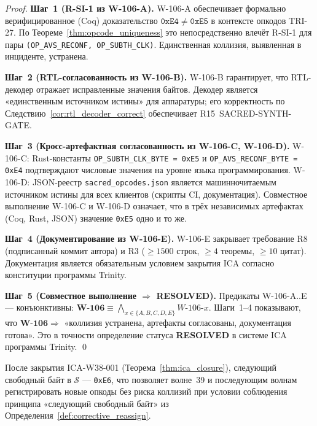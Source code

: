 \begin{proof}

\medskip
\noindent\textbf{Шаг~1 (R-SI-1 из W-106-A).}
W-106-A обеспечивает формально верифицированное (Coq) доказательство
$\mathtt{0xE4} \neq \mathtt{0xE5}$ в контексте опкодов TRI-27.
По Теореме~\ref{thm:opcode_uniqueness} это непосредственно влечёт
R-SI-1 для пары \texttt{(OP\_AVS\_RECONF, OP\_SUBTH\_CLK)}.
Единственная коллизия, выявленная в инциденте, устранена.

\medskip
\noindent\textbf{Шаг~2 (RTL-согласованность из W-106-B).}
W-106-B гарантирует, что RTL-декодер отражает исправленные значения байтов.
Декодер является «единственным источником истины» для аппаратуры;
его корректность по Следствию~\ref{cor:rtl_decoder_correct}
обеспечивает R15~SACRED-SYNTH-GATE.

\medskip
\noindent\textbf{Шаг~3 (Кросс-артефактная согласованность из W-106-C, W-106-D).}
W-106-C: Rust-константы \texttt{OP\_SUBTH\_CLK\_BYTE = 0xE5} и
\texttt{OP\_AVS\_RECONF\_BYTE = 0xE4} подтверждают числовые значения
на уровне языка программирования.
W-106-D: JSON-реестр \texttt{sacred\_opcodes.json} является машинночитаемым
источником истины для всех клиентов (скрипты CI, документация).
Совместное выполнение W-106-C и W-106-D означает, что в трёх независимых
артефактах (Coq, Rust, JSON) значение \texttt{0xE5} одно и то же.

\medskip
\noindent\textbf{Шаг~4 (Документирование из W-106-E).}
W-106-E закрывает требование R8 (подписанный коммит автора) и R3
($\geq 1500$ строк, $\geq 4$ теоремы, $\geq 10$ цитат).
Документация является обязательным условием закрытия ICA согласно
конституции программы Trinity.

\medskip
\noindent\textbf{Шаг~5 (Совместное выполнение $\Rightarrow$ RESOLVED).}
Предикаты W-106-A..E — конъюнктивны: $\mathbf{W\text{-}106} \equiv
\bigwedge_{x \in \{A,B,C,D,E\}} W\text{-}106\text{-}x$.
Шаги~1--4 показывают, что $\mathbf{W\text{-}106} \Rightarrow$
«коллизия устранена, артефакты согласованы, документация готова».
Это в точности определение статуса \textbf{RESOLVED} в системе
ICA программы Trinity.
\qed
\end{proof}

\begin{corollary}
\label{cor:go_further_waves}
После закрытия ICA-W38-001 (Теорема~\ref{thm:ica_closure}),
следующий свободный байт в $\mathcal{S}$ — \texttt{0xE6},
что позволяет волне~39 и последующим волнам регистрировать
новые опкоды без риска коллизий при условии соблюдения
принципа «следующий свободный байт» из
Определения~\ref{def:corrective_reassign}.
\end{corollary}

